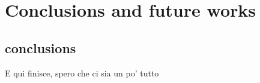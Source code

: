 \chapter{Conclusions and future works}
\label{chap:conclusions}

\section{conclusions}
E qui finisce, spero che ci sia un po' tutto

